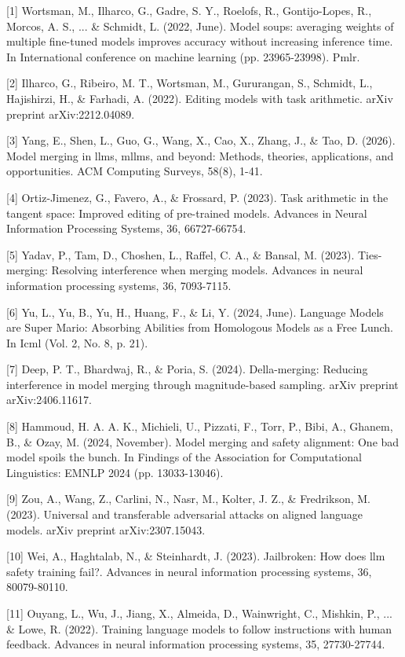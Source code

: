 [1] Wortsman, M., Ilharco, G., Gadre, S. Y., Roelofs, R., Gontijo-Lopes, R., Morcos, A. S., ... \& Schmidt, L. (2022, June). Model soups: averaging weights of multiple fine-tuned models improves accuracy without increasing inference time. In International conference on machine learning (pp. 23965-23998). Pmlr.

[2] Ilharco, G., Ribeiro, M. T., Wortsman, M., Gururangan, S., Schmidt, L., Hajishirzi, H., \& Farhadi, A. (2022). Editing models with task arithmetic. arXiv preprint arXiv:2212.04089.

[3] Yang, E., Shen, L., Guo, G., Wang, X., Cao, X., Zhang, J., \& Tao, D. (2026). Model merging in llms, mllms, and beyond: Methods, theories, applications, and opportunities. ACM Computing Surveys, 58(8), 1-41.

[4] Ortiz-Jimenez, G., Favero, A., \& Frossard, P. (2023). Task arithmetic in the tangent space: Improved editing of pre-trained models. Advances in Neural Information Processing Systems, 36, 66727-66754.

[5] Yadav, P., Tam, D., Choshen, L., Raffel, C. A., \& Bansal, M. (2023). Ties-merging: Resolving interference when merging models. Advances in neural information processing systems, 36, 7093-7115.

[6] Yu, L., Yu, B., Yu, H., Huang, F., \& Li, Y. (2024, June). Language Models are Super Mario: Absorbing Abilities from Homologous Models as a Free Lunch. In Icml (Vol. 2, No. 8, p. 21).

[7] Deep, P. T., Bhardwaj, R., \& Poria, S. (2024). Della-merging: Reducing interference in model merging through magnitude-based sampling. arXiv preprint arXiv:2406.11617.

[8] Hammoud, H. A. A. K., Michieli, U., Pizzati, F., Torr, P., Bibi, A., Ghanem, B., \& Ozay, M. (2024, November). Model merging and safety alignment: One bad model spoils the bunch. In Findings of the Association for Computational Linguistics: EMNLP 2024 (pp. 13033-13046).

[9] Zou, A., Wang, Z., Carlini, N., Nasr, M., Kolter, J. Z., \& Fredrikson, M. (2023). Universal and transferable adversarial attacks on aligned language models. arXiv preprint arXiv:2307.15043.

[10] Wei, A., Haghtalab, N., \& Steinhardt, J. (2023). Jailbroken: How does llm safety training fail?. Advances in neural information processing systems, 36, 80079-80110.

[11] Ouyang, L., Wu, J., Jiang, X., Almeida, D., Wainwright, C., Mishkin, P., ... \& Lowe, R. (2022). Training language models to follow instructions with human feedback. Advances in neural information processing systems, 35, 27730-27744.

